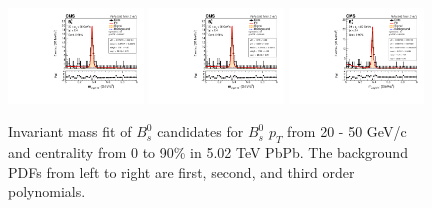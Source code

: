 \begin{figure}[hbtp]
\begin{center}
\includegraphics[width=0.32\textwidth]{Figures/Chapter5/data_PbPb_1_BptNew_2050_doubly0_0_90_background_1stEffInfoTreeFit.pdf}
\includegraphics[width=0.32\textwidth]{Figures/Chapter5/data_PbPb_1_BptNew_2050_doubly0_0_90_background_2ndEffInfoTreeFit.pdf}
\includegraphics[width=0.32\textwidth]{Figures/Chapter5/data_PbPb_1_BptNew_2050_doubly0_0_90_background_3rdEffInfoTreeFit.pdf}
\caption{Invariant mass fit of $B^0_s$ candidates for $B^0_s$ $p_T$ from 20 - 50 GeV/c and centrality from 0 to 90\% in 5.02 TeV PbPb. The background PDFs from left to right are first, second, and third order polynomials.}
\label{BsBkgdVar}
\end{center}
\end{figure}


